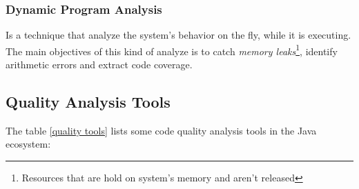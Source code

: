 \subsubsection{Dynamic Program Analysis}
Is a technique that analyze the system's behavior on the fly, while it is executing. The main objectives of this kind of analyze is to catch \textit{memory leaks}\footnote{Resources that are hold on system's memory and aren't released}, identify arithmetic errors and extract code coverage. 


\subsection{Quality Analysis Tools}

The table \ref{quality tools} lists some code quality analysis tools in the Java ecosystem:

